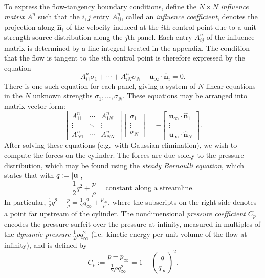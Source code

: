 \documentclass[10pt]{article}
\DeclarePairedDelimiter\abs{\lvert}{\rvert}
\newcommand\defn[1]{\emph{#1}}
\def\eg{e.g.~}
\def\ie{i.e.~}
\begin{document}
To express the flow-tangency boundary conditions, define the $N\times N$ \defn{influence matrix} $A^n$ such that the $i,j$ entry $A_{ij}^n$, called an \defn{influence coefficient}, denotes the projection along $\hat{\mathbf n}_i$ of the velocity induced at the $i$th control point due to a unit-strength source distribution along the $j$th panel.  Each entry $A_{ij}^n$ of the influence matrix is determined by a line integral treated in the appendix.  The condition that the flow is tangent to the $i$th control point is therefore expressed by the equation \[A_{i1}^n\sigma_1 + \cdots + A_{iN}^n\sigma_N + \mathbf u_\infty\cdot\hat{\mathbf n}_i = 0.\]  There is one such equation for each panel, giving a system of $N$ linear equations in the $N$ unknown strengths $\sigma_1,\ldots,\sigma_N$.  These equations may be arranged into matrix-vector form: \[\begin{bmatrix}A_{11}^n &\cdots &A_{1N}^n\\\vdots &\ddots &\vdots\\A_{N1}^n &\cdots &A_{NN}^n\end{bmatrix}\begin{bmatrix}\sigma_1\\\vdots\\\sigma_N\end{bmatrix}=-\begin{bmatrix}\mathbf u_\infty\cdot\hat{\mathbf n}_1\\\vdots\\\mathbf u_\infty\cdot\hat{\mathbf n}_N\end{bmatrix}.\]  After solving these equations (\eg with Gaussian elimination), we wish to compute the forces on the cylinder.  The forces are due solely to the pressure distribution, which may be found using the \defn{steady Bernoulli equation}, which states that with $q:=\abs{\mathbf u}$,
\begin{equation}\label{eqn:bernoulli_steady}
\frac{1}{2}q^2+\frac{p}{\rho}=\text{constant along a streamline}.
\end{equation}
In particular, $\frac{1}{2}q^2+\frac{p}{\rho}=\frac{1}{2}q_\infty^2+\frac{p_\infty}{\rho}$, where the subscripts on the right side denotes a point far upstream of the cylinder.  The nondimensional \defn{pressure coefficient} $C_p$ encodes the pressure surfeit over the pressure at infinity, measured in multiples of the \defn{dynamic pressure} $\frac{1}{2}\rho q_\infty^2$ (\ie kinetic energy per unit volume of the flow at infinity), and is defined by
\begin{equation}\label{eqn:pressure_coefficient}
C_p:=\frac{p-p_\infty}{\frac{1}{2}\rho q_\infty^2}=1-\left(\frac{q}{q_\infty}\right)^2.
\end{equation}
\end{document}

